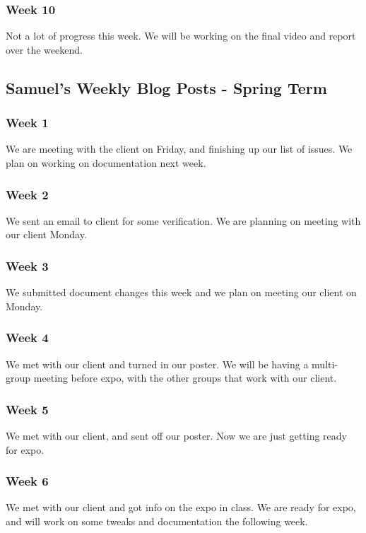 \subsubsection{Week 10}
Not a lot of progress this week. We will be working on the final video and report over the weekend.
\subsection{Samuel's Weekly Blog Posts - Spring Term}
\subsubsection{Week 1}
We are meeting with the client on Friday, and finishing up our list of issues. We plan on working on documentation next week.
\subsubsection{Week 2}
We sent an email to client for some verification. We are planning on meeting with our client Monday.
\subsubsection{Week 3}
We submitted document changes this week and we plan on meeting our client on Monday.
\subsubsection{Week 4}
We met with our client and turned in our poster. We will be having a multi-group meeting before expo, with the other groups that work with our client.
\subsubsection{Week 5}
We met with our client, and sent off our poster. Now we are just getting ready for expo.
\subsubsection{Week 6}
We met with our client and got info on the expo in class. We are ready for expo, and will work on some tweaks and documentation the following week.